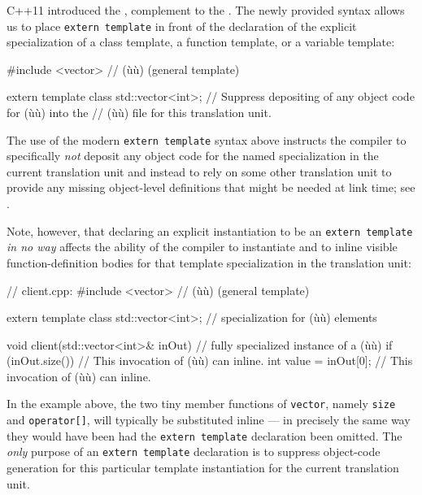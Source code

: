 C++11 introduced the ,
complement to the . The
newly provided syntax allows us to place
\lstinline!extern!~\lstinline!template! in front of the declaration of the
explicit specialization of a class template, a function template, or a
variable template: %

\begin{emcppslisting}
#include <vector>  // (ù{}ù) (general template)

extern template class std::vector<int>;
    // Suppress depositing of any object code for (ù{}ù) into the
    // (ù{}ù) file for this translation unit.
\end{emcppslisting}

\noindent The use of the modern \lstinline!extern!~\lstinline!template! syntax above
instructs the compiler to specifically \emph{not} deposit any object
code for the named specialization in the current translation unit and
instead to rely on some other translation unit to provide any missing
object-level definitions that might be needed at link time; see
.

Note, however, that declaring an explicit instantiation to be an
\lstinline!extern!~\lstinline!template! \emph{in no way} affects the ability
of the compiler to instantiate and to inline visible function-definition
bodies for that template specialization in the translation unit:

\begin{emcppslisting}
// client.cpp:
#include <vector>  // (ù{}ù) (general template)

extern template class std::vector<int>;  // specialization for (ù{}ù) elements

void client(std::vector<int>& inOut)  // fully specialized instance of a (ù{}ù)
{
    if (inOut.size())          // This invocation of (ù{}ù) can inline.
    {
        int value = inOut[0];  // This invocation of (ù{}ù) can inline.
    }
}
\end{emcppslisting}

\noindent In the example above, the two tiny member functions of \lstinline!vector!,
namely \lstinline!size! and \lstinline!operator[]!, will typically be
substituted inline --- in precisely the same way they would have been
had the \lstinline!extern!~\lstinline!template! declaration been omitted. The
\emph{only} purpose of an \lstinline!extern!~\lstinline!template! declaration
is to suppress object-code generation for this particular template
instantiation for the current translation unit.

